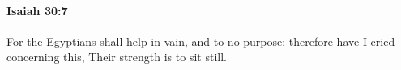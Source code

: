 
		\paragraph{Isaiah 30:7} %
			\label{ISAIAH-30-7}

			For the Egyptians shall help in vain, and to no purpose: therefore have I cried concerning this, Their strength is to sit still.


